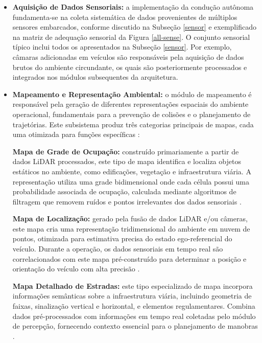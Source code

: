 \begin{itemize}
\item \textbf{Aquisição de Dados Sensoriais:} a implementação da condução autônoma fundamenta-se na coleta sistemática de dados provenientes de múltiplos sensores embarcados, conforme discutido na Subseção \ref{sensor} e exemplificado na matriz de adequação sensorial da Figura \ref{all-sense}. O conjunto sensorial típico inclui todos os apresentados na Subseção \ref{sensor}. Por exemplo, câmaras adicionadas em veículos são responsáveis pela aquisição de dados brutos do ambiente circundante, os quais são posteriormente processados e integrados nos módulos subsequentes da arquitetura. 

\item \textbf{Mapeamento e Representação Ambiental:} o módulo de mapeamento é responsável pela geração de diferentes representações espaciais do ambiente operacional, fundamentais para a prevenção de colisões e o planejamento de trajetórias. Este subsistema produz três categorias principais de mapas, cada uma otimizada para funções específicas \cite[Week 2 - Lesson 3: Software Architecture. ~6min24s]{University_of_Toronto2018-fe}:

\textbf{Mapa de Grade de Ocupação:} construído primariamente a partir de dados LiDAR processados, este tipo de mapa identifica e localiza objetos estáticos no ambiente, como edificações, vegetação e infraestrutura viária. A representação utiliza uma grade bidimensional onde cada célula possui uma probabilidade associada de ocupação, calculada mediante algoritmos de filtragem que removem ruídos e pontos irrelevantes dos dados sensoriais \cite[p. ~14]{zheng2023simultaneous}.

\textbf{Mapa de Localização:} gerado pela fusão de dados LiDAR e/ou câmeras, este mapa cria uma representação tridimensional do ambiente em nuvem de pontos, otimizada para estimativa precisa do estado ego-referencial do veículo. Durante a operação, os dados sensoriais em tempo real são correlacionados com este mapa pré-construído para determinar a posição e orientação do veículo com alta precisão \cite[p. ~14]{zheng2023simultaneous}. 

\textbf{Mapa Detalhado de Estradas:} este tipo especializado de mapa incorpora informações semânticas sobre a infraestrutura viária, incluindo geometria de faixas, sinalização vertical e horizontal, e elementos regulamentares. Combina dados pré-processados com informações em tempo real coletadas pelo módulo de percepção, fornecendo contexto essencial para o planejamento de manobras \cite[p. ~15]{zheng2023simultaneous}.


\end{itemize}
